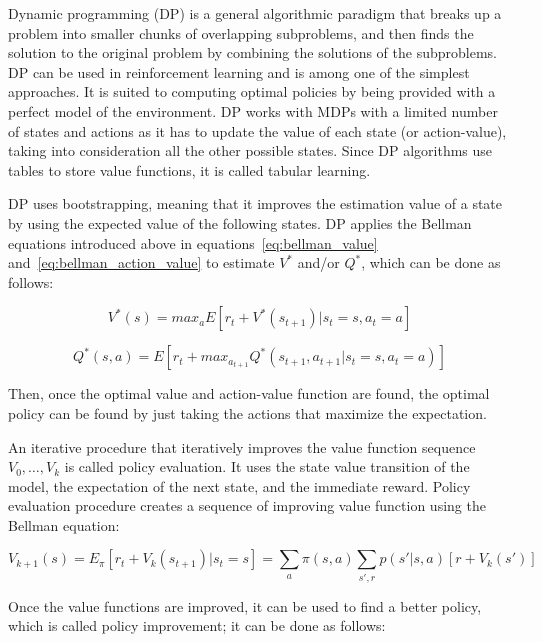 Dynamic programming (DP) is a general algorithmic paradigm that breaks up a problem into smaller chunks of overlapping subproblems, and then finds the solution to the original problem by combining the solutions of the subproblems.
DP can be used in reinforcement learning and is among one of the simplest approaches.
It is suited to computing optimal policies by being provided with a perfect model of the environment.
DP works with MDPs with a limited number of states and actions as it has to update the value of each state (or action-value), taking into consideration all the other possible states.
Since DP algorithms use tables to store value functions, it is called tabular learning.

DP uses bootstrapping, meaning that it improves the estimation value of a state by using the expected value of the following states.
DP applies the Bellman equations introduced above in equations~\ref{eq:bellman_value} and~\ref{eq:bellman_action_value} to estimate $V^*$ and/or $Q^*$, which can be done as follows:

\begin{equation} \label{eq:mdp_dp_optimal_value}
    V^*(s) = max_a E [r_t + V^*(s_{t+1}) | s_t = s, a_t = a]
\end{equation}

\begin{equation} \label{eq:mdp_dp_optimal_action_value}
    Q^*(s, a) = E [r_t + max_{a_{t+1}} Q^* (s_{t+1}, a_{t+1} | s_t = s, a_t = a)]
\end{equation}

Then, once the optimal value and action-value function are found, the optimal policy can be found by just taking the actions that maximize the expectation.

An iterative procedure that iteratively improves the value function sequence $V_0, \dots, V_k$ is called policy evaluation.
It uses the state value transition of the model, the expectation of the next state, and the immediate reward.
Policy evaluation procedure creates a sequence of improving value function using the Bellman equation:

\begin{equation}
    V_{k+1} (s) = E_\pi [r_t + V_k(s_{t+1}) | s_t = s]
    = \sum \limits_a \pi(s, a) \sum \limits_{s', r} p (s'|s, a)[r + V_k(s')]
\end{equation}

Once the value functions are improved, it can be used to find a better policy, which is called policy improvement;
it can be done as follows:

